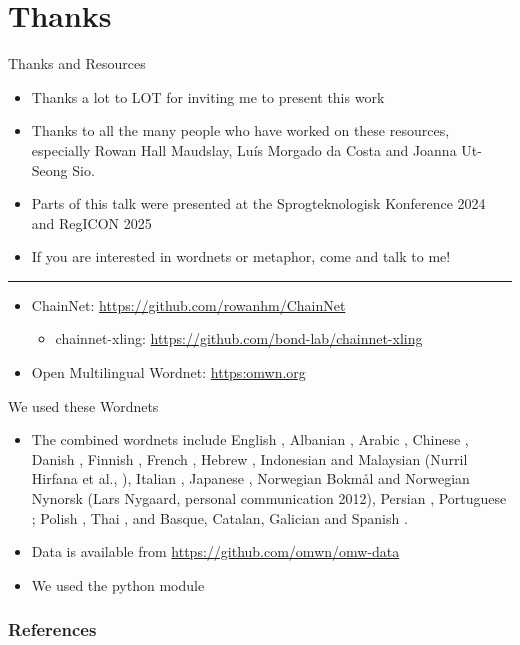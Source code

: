 \documentclass[xetex]{beamer}
\begin{document}
\section{Thanks}

\begin{frame}{Thanks and Resources}

  \begin{itemize}
  \item Thanks a lot to LOT for inviting me to present this work
  \item Thanks to all the many people who have worked on these
    resources, especially  Rowan Hall Maudslay, Luís Morgado da Costa and Joanna Ut-Seong Sio.
   \item Parts of this talk were presented at the Sprogteknologisk Konference 2024 and RegICON 2025
  \item If you are interested in wordnets or metaphor, come and talk to me!
  \end{itemize}
  \medskip
  \hrule
  \medskip
  \begin{itemize}
  \item ChainNet: \url{https://github.com/rowanhm/ChainNet}
    \begin{itemize}
    \item chainnet-xling: \url{https://github.com/bond-lab/chainnet-xling}
    \end{itemize}
  \item Open Multilingual Wordnet: \url{https:omwn.org}
  \end{itemize}

  
\end{frame}

\begin{frame}{We used these Wordnets}
  \begin{itemize}
  \item The combined wordnets include 
English \citep{_Fellbaum:1998}, 
Albanian \citep{Ruci:2008}, 
Arabic \citep{Black:Elkateb:Rodriguez:Alkhalifa:Vossen:Pease:Bertran:Fellbaum:2006}, 
Chinese \citep{Huang:Hsieh:Hong:Chen:Su:Chen:Huang:2010}, 
Danish \citep{Pedersen:2009}, 
Finnish \citep{Linden:Carlson:2010}, 
French \citep{Sagot:Fiser:2008}, 
Hebrew \citep{Ordan:Wintner:2007},
Indonesian and Malaysian (Nurril Hirfana et al., \citeyear{Noor:Sapuan:Bond:2011}), 
Italian \citep{Pianta:Bentivogli:Girardi:2002,Toral:Bracale:Monachini:Soria:2010}, 
Japanese \citep{Isahara:Bond:Uchimoto:Utiyama:Kanzaki:2008}, 
Norwegian Bokm\r{a}l and Norwegian Nynorsk (Lars Nygaard, personal communication 2012),
Persian \citep{Montazery:Faili:2010}, 
Portuguese \citep{Paiva:Rademaker:2012};
Polish \citep{Piasecki:Szpakowicz:Broda:2009}, 
Thai \citep{Thoongsup:Charoenporn:Robkop:Sinthurahat:Mokarat:Sornlertlamvanich:Isahara:2009},
and Basque, Catalan, Galician and Spanish \citep{Gonzalez-Agirre:Laparra:Rigau:2012}.
\item Data is available from \url{https://github.com/omwn/omw-data}
\item We used the python  module \citep{Goodman:Bond:2021}
\end{itemize}
\end{frame}

\begin{frame}[allowframebreaks]
        \frametitle{References}
        
        
\end{frame}
\end{document}
